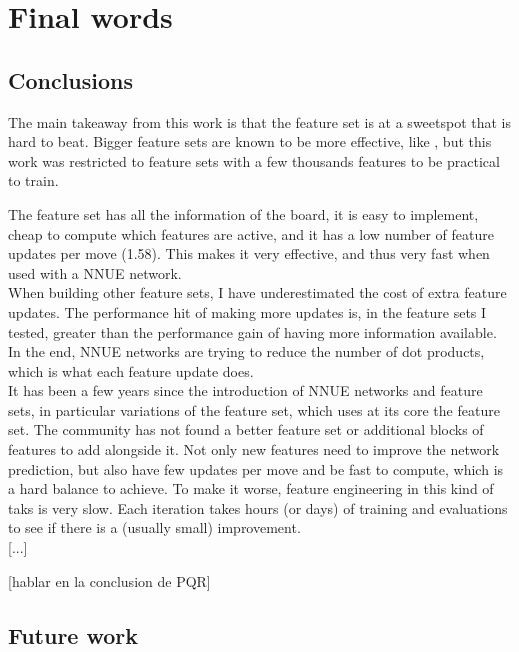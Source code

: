 \section{Final words}
\subsection{Conclusions}


The main takeaway from this work is that the  feature set is at a sweetspot that is hard to beat. Bigger feature sets are known to be more effective, like , but this work was restricted to feature sets with a few thousands features to be practical to train.

The feature set  has all the information of the board, it is easy to implement, cheap to compute which features are active, and it has a low number of feature updates per move (1.58). This makes it very effective, and thus very fast when used with a NNUE network. \\

When building other feature sets, I have underestimated the cost of extra feature updates. The performance hit of making more updates is, in the feature sets I tested, greater than the performance gain of having more information available. In the end, NNUE networks are trying to reduce the number of dot products, which is what each feature update does. \\

It has been a few years since the introduction of NNUE networks and feature sets, in particular variations of the  feature set, which uses at its core the  feature set. 
The community has not found a better feature set or additional blocks of features to add alongside it. Not only new features need to improve the network prediction, but also have few updates per move and be fast to compute, which is a hard balance to achieve.
To make it worse, feature engineering in this kind of taks is very slow. Each iteration takes hours (or days) of training and evaluations to see if there is a (usually small) improvement. \\

[...]

[hablar en la conclusion de PQR]

\subsection{Future work}

